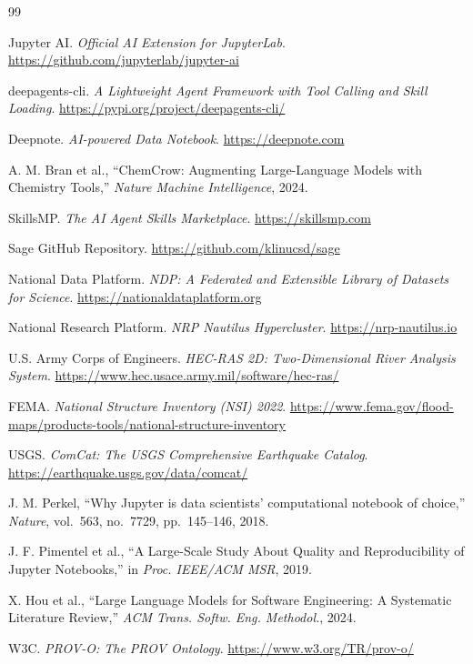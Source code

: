 \documentclass[10pt,twocolumn]{article}
\begin{document}

\begin{thebibliography}{99}

Jupyter AI. \textit{Official AI Extension for JupyterLab}. \url{https://github.com/jupyterlab/jupyter-ai}

deepagents-cli. \textit{A Lightweight Agent Framework with Tool Calling and Skill Loading}. \url{https://pypi.org/project/deepagents-cli/}

Deepnote. \textit{AI-powered Data Notebook}. \url{https://deepnote.com}

A. M. Bran et al., ``ChemCrow: Augmenting Large-Language Models with Chemistry Tools,'' \textit{Nature Machine Intelligence}, 2024.

SkillsMP. \textit{The AI Agent Skills Marketplace}. \url{https://skillsmp.com}

Sage GitHub Repository. \url{https://github.com/klinucsd/sage}

National Data Platform. \textit{NDP: A Federated and Extensible Library of Datasets for Science}. \url{https://nationaldataplatform.org}

National Research Platform. \textit{NRP Nautilus Hypercluster}. \url{https://nrp-nautilus.io}

U.S. Army Corps of Engineers. \textit{HEC-RAS 2D: Two-Dimensional River Analysis System}. \url{https://www.hec.usace.army.mil/software/hec-ras/}

FEMA. \textit{National Structure Inventory (NSI) 2022}. \url{https://www.fema.gov/flood-maps/products-tools/national-structure-inventory}

USGS. \textit{ComCat: The USGS Comprehensive Earthquake Catalog}. \url{https://earthquake.usgs.gov/data/comcat/}

J. M. Perkel, ``Why Jupyter is data scientists' computational notebook of choice,'' \textit{Nature}, vol.~563, no.~7729, pp.~145--146, 2018.

J. F. Pimentel et al., ``A Large-Scale Study About Quality and Reproducibility of Jupyter Notebooks,'' in \textit{Proc. IEEE/ACM MSR}, 2019.

X. Hou et al., ``Large Language Models for Software Engineering: A Systematic Literature Review,'' \textit{ACM Trans. Softw. Eng. Methodol.}, 2024.

W3C. \textit{PROV-O: The PROV Ontology}. \url{https://www.w3.org/TR/prov-o/}

\end{thebibliography}
\end{document}
